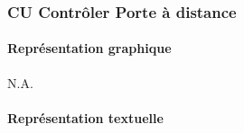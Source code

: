 \subsubsection{CU Contrôler Porte à distance}

\paragraph{Représentation graphique}

N.A.

\paragraph{Représentation textuelle}
\hypertarget{CU_Controler_Porte}{}


